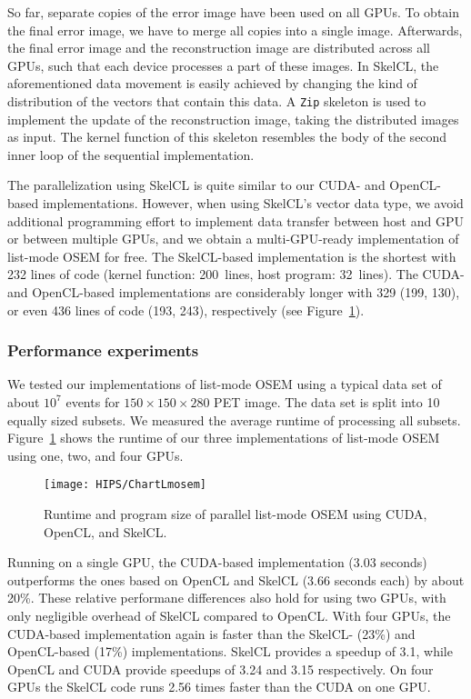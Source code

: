So far, separate copies of the error image have been used on all GPUs.
To obtain the final error image, we have to merge all copies into a single image.
Afterwards, the final error image and the reconstruction image are distributed across all GPUs, such that each device processes a part of these images.
In SkelCL, the aforementioned data movement is easily achieved by changing the kind of distribution of the vectors that contain this data.
A \texttt{Zip} skeleton is used to implement the update of the reconstruction image, taking the distributed images as input.
The kernel function of this skeleton resembles the body of the second inner loop of the sequential implementation.

The parallelization using SkelCL is quite similar to our CUDA- and OpenCL-based implementations.
However, when using SkelCL's vector data type, we avoid additional programming effort to implement data transfer between host and GPU or between multiple GPUs, and we obtain a multi-GPU-ready implementation of list-mode OSEM for free.
The SkelCL-based implementation is the shortest with 232 lines of code (kernel function: 200~lines, host program: 32~lines).
The CUDA- and OpenCL-based implementations are considerably longer with 329 (199, 130), or even 436 lines of code (193, 243), respectively (see Figure~\ref{fig:lmosem_results}).


\subsubsection{Performance experiments}

We tested our implementations of list-mode OSEM using a typical data set of about $10^7$ events for $150\times 150\times 280$ PET image.
The data set is split into 10 equally sized subsets.
We measured the average runtime of processing all subsets.
Figure~\ref{fig:lmosem_results} shows the runtime of our three implementations of list-mode OSEM using one, two, and four GPUs.

\begin{figure}[tbp]
	\centering
	\label{fig:lmosem_runtime}%
	\label{fig:lmosem_speedup}%
	\texttt{[image: HIPS/ChartLmosem]}
	\caption{Runtime and program size of parallel list-mode OSEM using CUDA, OpenCL, and SkelCL.}
	\label{fig:lmosem_results}
\end{figure}

Running on a single GPU, the CUDA-based implementation (3.03 seconds) outperforms the ones based on OpenCL and SkelCL (3.66 seconds each) by about 20\%.
These relative performane differences also hold for using two GPUs, with only negligible overhead of SkelCL compared to OpenCL.
With four GPUs, the CUDA-based implementation again is faster than the SkelCL- (23\%) and OpenCL-based (17\%) implementations.
SkelCL provides a speedup of 3.1, while OpenCL and CUDA provide speedups of 3.24 and 3.15 respectively.
On four GPUs the SkelCL code runs 2.56 times faster than the CUDA on one GPU.

